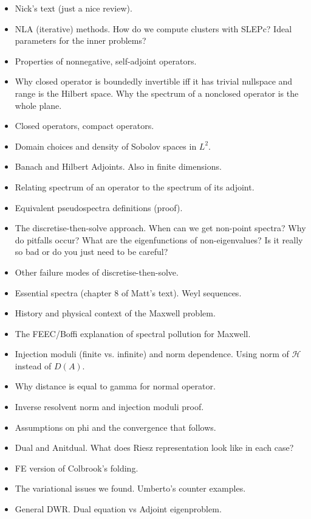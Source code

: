 \documentclass[12pt,a4paper]{article}
\begin{document}
\begin{itemize}
    \item Nick's text (just a nice review).
    \item NLA (iterative) methods. How do we compute clusters with SLEPc? Ideal parameters for the inner problems?
    \item Properties of nonnegative, self-adjoint operators.
    \item Why closed operator is boundedly invertible iff it has trivial nullspace and range is the Hilbert space. Why the spectrum of a nonclosed operator is the whole plane. 
    \item Closed operators, compact operators. 
    \item Domain choices and density of Sobolov spaces in $L^2.$
    \item Banach and Hilbert Adjoints. Also in finite dimensions.
    \item Relating spectrum of an operator to the spectrum of its adjoint. 
    \item Equivalent pseudospectra definitions (proof). 
    \item The discretise-then-solve approach. When can we get non-point spectra? Why do pitfalls occur? What are the eigenfunctions of non-eigenvalues? Is it really so bad or do you just need to be careful?
    \item Other failure modes of discretise-then-solve.
    \item Essential spectra (chapter 8 of Matt's text). Weyl sequences. 
    \item History and physical context of the Maxwell problem.
    \item The FEEC/Boffi explanation of spectral pollution for Maxwell. 
    \item Injection moduli (finite vs. infinite) and norm dependence. Using norm of $\mathcal{H}$ instead of $D(A).$
    \item Why distance is equal to gamma for normal operator. 
    \item Inverse resolvent norm and injection moduli proof. 
    \item Assumptions on phi and the convergence that follows. 
    \item Dual and Anitdual. What does Riesz representation look like in each case?
    \item FE version of Colbrook's folding.
    \item The variational issues we found. Umberto's counter examples. 
    \item General DWR. Dual equation vs Adjoint eigenproblem.

\end{itemize}
\end{document}
